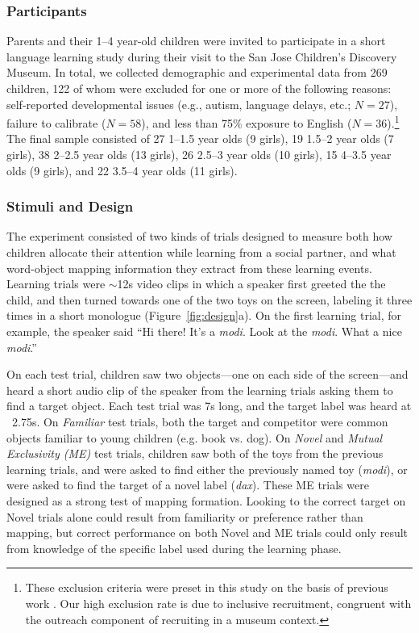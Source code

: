 \documentclass[man,floatsintext]{apa6}
\begin{document}
\subsubsection{Participants}

Parents and their 1--4 year-old children were invited to participate in a short language learning study during their visit to the San Jose Children's Discovery Museum. In total, we collected demographic and experimental data from 269 children, 122 of whom were excluded for one or more of the following reasons: self-reported developmental issues (e.g., autism, language delays, etc.; $N= 27$), failure to calibrate ($N=58$), and less than 75\% exposure to English ($N=36$).\footnote{These exclusion criteria were preset in this study on the basis of previous work \cite{Yurovsky2013c}. Our high exclusion rate is due to inclusive recruitment, congruent with the outreach component of recruiting in a museum context.} The final sample consisted of 27 1--1.5 year olds (9 girls), 19 1.5--2 year olds (7 girls), 38 2--2.5 year olds (13 girls), 26 2.5--3 year olds (10 girls), 15 4--3.5 year olds (9 girls), and 22 3.5--4 year olds (11 girls).

\subsubsection{Stimuli and Design}

The experiment consisted of two kinds of trials designed to measure both how children allocate their attention while learning from a social partner, and what word-object mapping information they extract from these learning events. Learning trials were $\sim$12s video clips in which a speaker first greeted the the child, and then turned towards one of the two toys on the screen, labeling it three times in a short monologue (Figure~\ref{fig:design}a). On the first learning trial, for example, the speaker said ``Hi there! It's a \emph{modi}. Look at the \emph{modi}. What a nice \emph{modi}.''

On each test trial, children saw two objects---one on each side of the screen---and heard a short audio clip of the speaker from the learning trials asking them to find a target object. Each test trial was 7s long, and the target label was heard at ~2.75s. On \emph{Familiar} test trials, both the target and competitor were common objects familiar to young children (e.g. book vs. dog). On \emph{Novel} and  \emph{Mutual Exclusivity (ME)} test trials, children saw both of the toys from the previous learning trials, and were asked to find either the previously named toy (\emph{modi}), or were asked to find the target of a novel label (\emph{dax}). These ME trials were designed as a strong test of mapping formation. Looking to the correct target on Novel trials alone could result from familiarity or preference rather than mapping, but correct performance on both Novel and ME trials could only result from knowledge of the specific label used during the learning phase.
\end{document}
